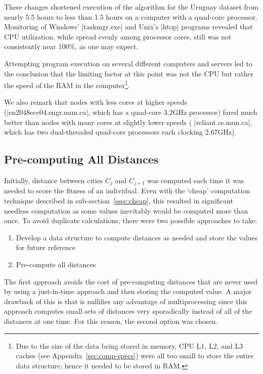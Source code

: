 These changes shortened execution of the algorithm for the Uruguay dataset
from nearly 5.5 hours to less than 1.5 hours on a computer with a quad-core
processor. Monitoring of Windows' |taskmgr.exe| and Unix's |htop| programs
revealed that CPU utilization, while spread evenly among processor cores,
still was not consistently near 100\%, as one may expect. 

Attempting program execution on several different computers and servers 
led to the conclusion that the limiting factor at this point was not the CPU 
but rather the speed of the RAM in the computer\footnote{Due to the size of
the data being stored in memory, CPU L1, L2, and L3 caches (see
Appendix~\ref{sec:comp-specs}) were all too small to store the entire 
data structure; hence it needed to be stored in RAM.}. 

We also remark that nodes with less cores at higher speeds
(\ie |en2048ece04.engr.mun.ca|, which has a quad-core 3.2GHz processor) 
fared much better than nodes with many cores at slightly lower speeds (\ie 
|reliant.cs.mun.ca|, which has two dual-threaded quad-core processors 
each clocking 2.67GHz).

\subsection{Pre-computing All Distances}\label{ssec:precomputing}
Initially, distance between cities $C_j$ and $C_{j+1}$ was computed each time 
it was needed to score the fitness of an individual. Even with the `cheap' 
computation technique described in sub-section~\ref{ssec:cheap}, this resulted in
significant needless computation as some values inevitably would be 
computed more than once. To avoid duplicate calculations, there were two
possible approaches to take:
\begin{enumerate}[label={(\roman*)}]
	\item Develop a data structure to compute distances as needed and 
	store the values for future reference
	\item Pre-compute all distances
\end{enumerate}
The first approach avoids the cost of pre-computing distances that are 
never used by using a just-in-time approach and then storing the computed
value. A major drawback of this is that is nullifies any advantage of 
multiprocessing since this approach computes small sets of distances 
very sporadically instead of all of the distances at one time. For this 
reason, the second option was chosen.